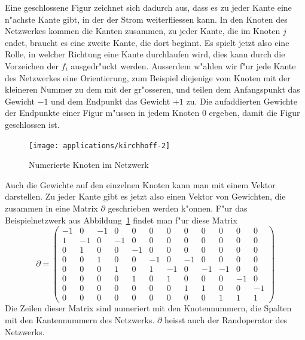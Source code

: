 Eine geschlossene Figur zeichnet sich dadurch aus, dass es zu
jeder Kante eine n"achste Kante gibt, in der der Strom weiterfliessen
kann. In den Knoten des Netzwerkes kommen die Kanten zusammen,
zu jeder Kante, die im Knoten $j$ endet, braucht es eine zweite
Kante, die dort beginnt.
Es spielt jetzt also eine Rolle, in welcher Richtung eine
Kante durchlaufen wird, dies kann durch die Vorzeichen der $f_i$
ausgedr"uckt werden. Ausserdem w"ahlen wir f"ur jede Kante
des Netzwerkes eine Orientierung, zum Beispiel diejenige vom
Knoten mit der kleineren Nummer zu dem mit der gr"osseren,
und teilen dem Anfangspunkt
das Gewicht $-1$ und dem Endpunkt das Gewicht $+1$ zu. Die
aufaddierten Gewichte der Endpunkte einer Figur m"ussen in jedem
Knoten $0$ ergeben, damit die Figur geschlossen ist.
\begin{figure}
\begin{center}
\texttt{[image: applications/kirchhoff-2]}
\end{center}
\caption{Numerierte Knoten im Netzwerk\label{netzwerk-numeriert}}
\end{figure}
Auch die Gewichte auf den einzelnen Knoten kann man mit einem
Vektor darstellen. Zu jeder Kante gibt es jetzt also einen
Vektor von Gewichten, die zusammen in eine Matrix $\partial$
geschrieben werden k"onnen.
F"ur das Beispielnetzwerk aus Abbildung~\ref{netzwerk-numeriert}
findet man f"ur diese Matrix
\setcounter{MaxMatrixCols}{12}
\[
\partial=\begin{pmatrix}
-1& 0&-1& 0& 0& 0& 0& 0& 0& 0& 0& 0\\
 1&-1& 0&-1& 0& 0& 0& 0& 0& 0& 0& 0\\
 0& 1& 0& 0&-1& 0& 0& 0& 0& 0& 0& 0\\
 0& 0& 1& 0& 0&-1& 0&-1& 0& 0& 0& 0\\
 0& 0& 0& 1& 0& 1&-1& 0&-1&-1& 0& 0\\
 0& 0& 0& 0& 1& 0& 1& 0& 0& 0&-1& 0\\
 0& 0& 0& 0& 0& 0& 0& 1& 1& 0& 0&-1\\
 0& 0& 0& 0& 0& 0& 0& 0& 0& 1& 1& 1
\end{pmatrix}
\]
Die Zeilen dieser Matrix sind numeriert mit den Knotennummern,
die Spalten mit den Kantennummern des Netzwerks. $\partial$
heisst auch der Randoperator des Netzwerks.

